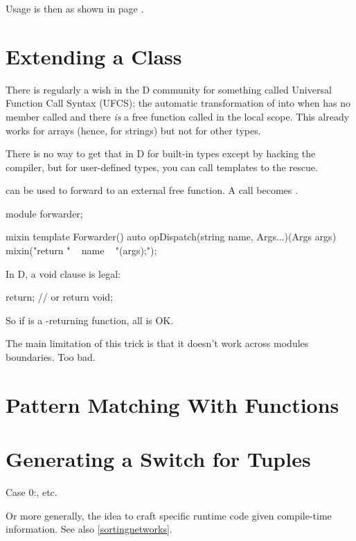 Usage is then as shown in page \pageref{usingcheckedwrite}.

\section{Extending a Class}\label{extendingaclass}

There is regularly a wish in the D community for something called Universal Function Call Syntax (UFCS): the automatic transformation of  into  when  has no member called  and there \emph{is} a free function called  in the local scope. This already works for arrays (hence, for strings) but not for other types.

There is no way to get that in D for built-in types except by hacking the compiler, but for user-defined types, you can call templates to the rescue.

 can be used to forward to an external free function. A call  becomes .

\begin{dcode}
module forwarder;

mixin template Forwarder()
{
    auto opDispatch(string name, Args...)(Args args)
    {
        mixin("return " ~ name ~ "(args);");
    }
}
\end{dcode}

In D, a void  clause is legal: 

\begin{dcode}
return;
// or return void;
\end{dcode}

So if  is a -returning function, all is OK.

The main limitation of this trick is that it doesn't work across modules boundaries. Too bad.

\section{Pattern Matching With Functions}


\section{Generating a Switch for Tuples}
Case 0:, etc.

Or more generally, the idea to craft specific runtime code given compile-time information.
See also \autoref{sortingnetworks}.
